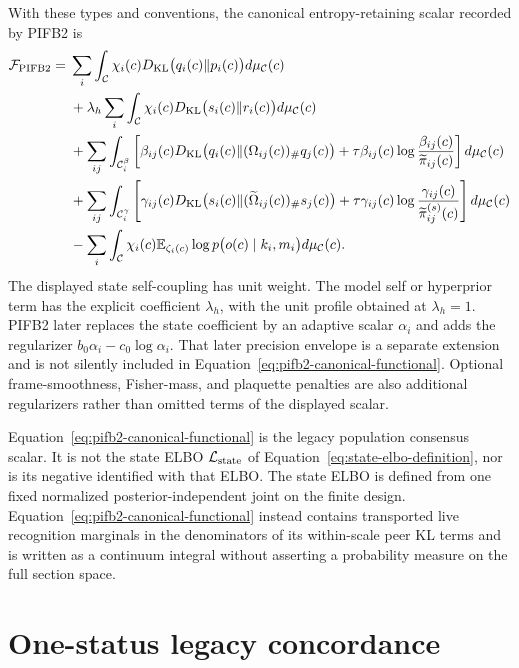 With these types and conventions, the canonical entropy-retaining scalar recorded by PIFB2 is
\begin{align}
\mathcal F_{\mathrm{PIFB2}}
={}&\sum_i\int_{\mathcal C}
\chi_i(c)D_{\mathrm{KL}}\bigl(q_i(c)\Vert p_i(c)\bigr)d\mu_{\mathcal C}(c)
\label{eq:pifb2-canonical-functional}\\
&+\lambda_h\sum_i\int_{\mathcal C}
\chi_i(c)D_{\mathrm{KL}}\bigl(s_i(c)\Vert r_i(c)\bigr)d\mu_{\mathcal C}(c)\notag\\
&+\sum_{ij}\int_{\mathcal C_i^{\beta}}\left[
\beta_{ij}(c)D_{\mathrm{KL}}\bigl(q_i(c)\Vert(\Omega_{ij}(c))_{\#}q_j(c)\bigr)
+\tau\beta_{ij}(c)\log\frac{\beta_{ij}(c)}{\widetilde\pi_{ij}(c)}
\right]d\mu_{\mathcal C}(c)\notag\\
&+\sum_{ij}\int_{\mathcal C_i^{\gamma}}\left[
\gamma_{ij}(c)D_{\mathrm{KL}}\bigl(s_i(c)\Vert(\widetilde\Omega_{ij}(c))_{\#}s_j(c)\bigr)
+\tau\gamma_{ij}(c)\log
\frac{\gamma_{ij}(c)}{\widetilde\pi_{ij}^{(s)}(c)}
\right]d\mu_{\mathcal C}(c)\notag\\
&-\sum_i\int_{\mathcal C}\chi_i(c)
\mathbb E_{\zeta_i(c)}\log p\bigl(o(c)\mid k_i,m_i\bigr)d\mu_{\mathcal C}(c).
\notag
\end{align}
The displayed state self-coupling has unit weight. The model self or hyperprior term has the explicit coefficient \(\lambda_h\), with the unit profile obtained at \(\lambda_h=1\). PIFB2 later replaces the state coefficient by an adaptive scalar \(\alpha_i\) and adds the regularizer \(b_0\alpha_i-c_0\log\alpha_i\). That later precision envelope is a separate extension and is not silently included in Equation~\eqref{eq:pifb2-canonical-functional}. Optional frame-smoothness, Fisher-mass, and plaquette penalties are also additional regularizers rather than omitted terms of the displayed scalar.

Equation~\eqref{eq:pifb2-canonical-functional} is the legacy population consensus scalar. It is not the state ELBO \(\mathcal L_{\mathrm{state}}\) of Equation~\eqref{eq:state-elbo-definition}, nor is its negative identified with that ELBO. The state ELBO is defined from one fixed normalized posterior-independent joint on the finite design. Equation~\eqref{eq:pifb2-canonical-functional} instead contains transported live recognition marginals in the denominators of its within-scale peer KL terms and is written as a continuum integral without asserting a probability measure on the full section space.

\section{One-status legacy concordance}

